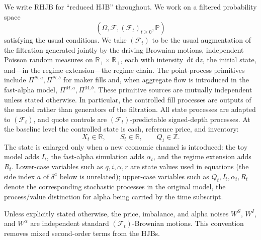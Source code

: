 \documentclass[11pt,a4paper]{article}
\newcommand{\Prob}{\mathbb{P}}
\newcommand{\R}{\mathbb{R}}
\newcommand{\Z}{\mathbb{Z}}
\newcommand{\Fcal}{\mathcal{F}}
\newcommand{\dd}{\,\mathrm{d}}
\theoremstyle{plain}
\theoremstyle{definition}
\begin{document}
We write RHJB for ``reduced HJB'' throughout.
We work on a filtered probability space
\[
(\Omega,\Fcal,(\Fcal_t)_{t\ge0},\Prob)
\]
satisfying the usual conditions.  We take \((\Fcal_t)\) to be the usual
augmentation of the filtration generated jointly by the driving Brownian
motions, independent Poisson random measures on \(\R_+\times\R_+\), each with
intensity \(\dd t\,\dd z\), the initial state, and---in the regime
extension---the regime chain.  The point-process primitives include
\(\Pi^{N,a},\Pi^{N,b}\) for maker fills and, when aggregate flow is introduced
in the fast-alpha model, \(\Pi^{M,a},\Pi^{M,b}\).  These primitive sources are
mutually independent unless stated otherwise.  In particular, the controlled fill
processes are outputs of the model rather than generators of the filtration.
All state processes are adapted to \((\Fcal_t)\), and quote controls are
\((\Fcal_t)\)-predictable signed-depth processes.
At the baseline level the controlled state is cash, reference price, and
inventory:
\[
X_t\in\R,\qquad S_t\in\R,\qquad Q_t\in\Z.
\]
The state is enlarged only when a new economic channel is introduced: the toy
model adds \(I_t\), the fast-alpha simulation adds \(\alpha_t\), and the
regime extension adds \(R_t\).  Lower-case variables such as \(q,i,\alpha,r\)
are state values used in equations (the side index \(a\) of \(\delta^a\) below
is unrelated); upper-case variables such as
\(Q_t,I_t,\alpha_t,R_t\) denote the corresponding stochastic processes in the
original model, the process/value distinction for alpha being carried by the
time subscript.

Unless explicitly stated otherwise, the price, imbalance, and alpha noises
\(W^S\), \(W^I\), and \(W^\alpha\) are independent standard
\((\Fcal_t)\)-Brownian motions.  This convention removes mixed second-order
terms from the HJBs.
\end{document}
